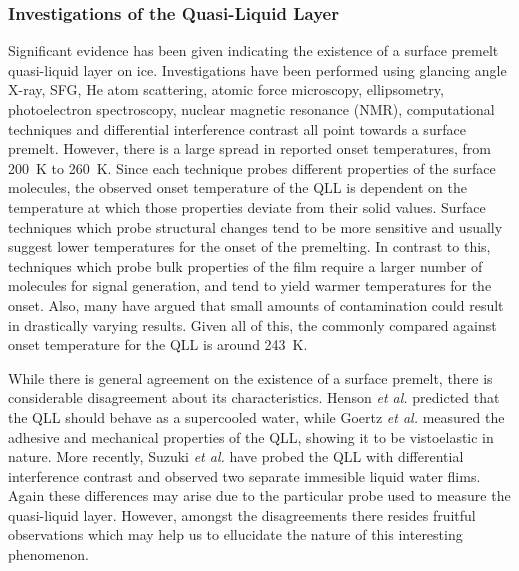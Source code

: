 \subsubsection{Investigations of the Quasi-Liquid Layer}
Significant evidence has been given indicating the existence of a
surface premelt quasi-liquid layer on ice. Investigations have been
performed using glancing angle X-ray\cite{Lied1994, Dosch1995},
SFG\cite{Wei2001}, He atom scattering\cite{Suter2006}, atomic force
microscopy\cite{Goertz2009,Doppenschmidt2000},
ellipsometry\cite{Furukawa1997}, photoelectron
spectroscopy\cite{Bluhm2002}, nuclear magnetic resonance
(NMR)\cite{Dec2009,Dec2012}, computational
techniques\cite{Conde2008,Neshyba2009,Gladich2011,Pfalzgraff2011,Gladich2015,Park2010,Shepherd2012,Limmer2014,Persson2015}
and differential interference
contrast\cite{Sazaki2012,Asakawa2016,Sazaki2013} all point towards a
surface premelt. However, there is a large spread in reported onset
temperatures, from 200~K to 260~K. Since each technique probes
different properties of the surface molecules, the observed onset
temperature of the QLL is dependent on the temperature at which those
properties deviate from their solid values. Surface techniques which
probe structural changes tend to be more sensitive and usually suggest
lower temperatures for the onset of the premelting. In contrast to
this, techniques which probe bulk properties of the film require a
larger number of molecules for signal generation, and tend to yield
warmer temperatures for the onset. Also, many have argued that small
amounts of contamination could result in drastically varying
results.\cite{Elbaum1993,Wettlaufer1999} Given all of this, the
commonly compared against onset temperature for the QLL is around
243~K.

While there is general agreement on the existence of a
surface premelt, there is considerable disagreement about its
characteristics. Henson \textit{et al.} predicted that the QLL should
behave as a supercooled water\cite{Henson2005}, while Goertz
\textit{et al.}  measured the adhesive and mechanical properties of
the QLL, showing it to be vistoelastic in nature.\cite{Goertz2009}
More recently, Suzuki \textit{et al.}  have probed the QLL with
differential interference contrast and observed two separate immesible
liquid water flims.\cite{Sazaki2012,Asakawa2016,Sazaki2013} Again
these differences may arise due to the particular probe used to
measure the quasi-liquid layer. However, amongst the disagreements
there resides fruitful observations which may help us to ellucidate
the nature of this interesting phenomenon. 


